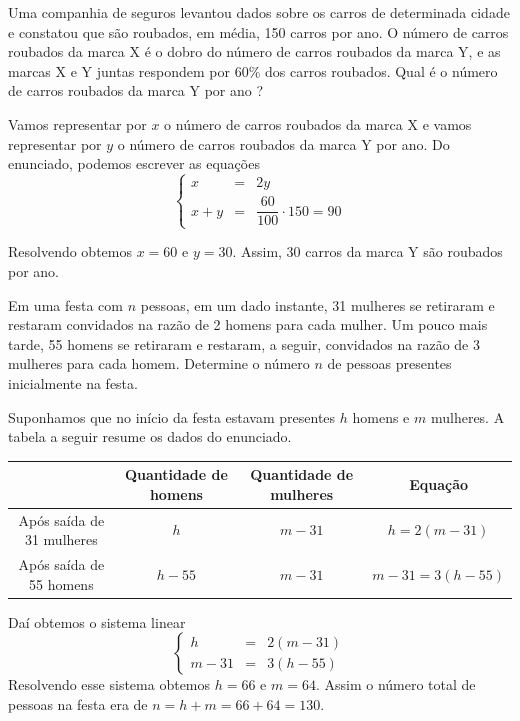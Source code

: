 \begin{problem}
Uma companhia de seguros levantou dados sobre os carros de determinada cidade e constatou que são roubados, em média, 150 carros por ano.
O número de carros roubados da marca X é o dobro do número de carros roubados da marca Y,
e as marcas X e Y juntas respondem por 60\% dos carros roubados. Qual é o número de carros roubados da marca Y por ano ?
\end{problem}
\begin{solution}
Vamos representar por $x$ o número de carros roubados da marca X e vamos representar por $y$ o número de carros roubados da marca Y por ano.
Do enunciado, podemos escrever as equações
$$\left\{ \begin{array}{rcl}
 x       & = &   2y \\[10pt]
 x + y   & = &  \dfrac{60}{100} \cdot 150 = 90\end{array} \right.$$

Resolvendo obtemos $x=60$ e $y=30$. Assim, 30 carros da marca Y são roubados por ano.
\end{solution}

\begin{problem}
Em uma festa com $n$ pessoas, em um dado instante, 31 mulheres se retiraram e restaram convidados na razão de 2 homens para cada mulher. Um pouco mais tarde, 55 homens se retiraram e restaram, a seguir, convidados na razão de 3 mulheres para cada homem. Determine o número $n$ de pessoas presentes inicialmente na festa.
\end{problem}
\begin{solution}
Suponhamos que no início da festa estavam presentes $h$ homens e $m$ mulheres. A tabela a seguir resume os dados do enunciado.

\begin{center}
\begin{tabular}{|c|c|c|c|} \hline
                             & Quantidade de homens    & Quantidade de mulheres    &  Equação          \\ \hline
Após saída de 31 mulheres    &        $h$              &    $m-31$                 &  $h=2(m-31)$      \\ \hline
 Após saída de 55 homens     &      $h-55$             &    $m-31$                 &  $m-31=3(h-55)$   \\ \hline
\end{tabular}
\end{center}

Daí obtemos o sistema linear
$$\left\{ \begin{array}{ccc}
h     & = &  2(m-31)   \\[5pt]
m-31  & = &  3(h-55)   \end{array} \right.$$
Resolvendo esse sistema obtemos $h=66$ e $m=64$. Assim o número total de pessoas na festa era de $n=h+m=66+64=130$.
\end{solution}

